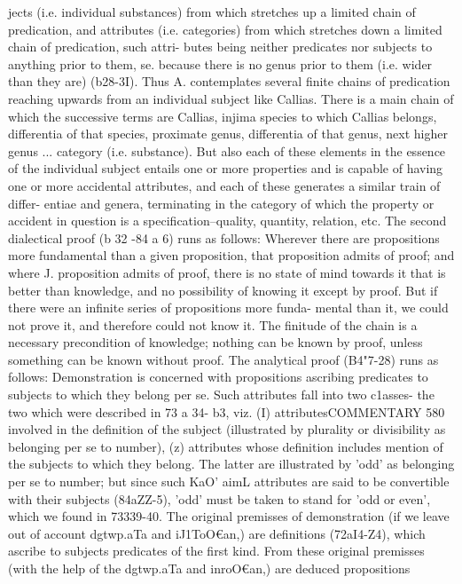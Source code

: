 {{{{{{{{{{{{{{{{{{{{{{{{{{{{{{jects (i.e. individual substances) from which stretches up a
limited chain of predication, and attributes (i.e. categories) from
which stretches down a limited chain of predication, such attri-
butes being neither predicates nor subjects to anything prior
to them, se. because there is no genus prior to them (i.e. wider
than they are) (b28-3I). Thus A. contemplates several finite
chains of predication reaching upwards from an individual subject
like Callias. There is a main chain of which the successive terms
are Callias, injima species to which Callias belongs, differentia
of that species, proximate genus, differentia of that genus, next
higher genus ... category (i.e. substance). But also each of these
elements in the essence of the individual subject entails one or
more properties and is capable of having one or more accidental
attributes, and each of these generates a similar train of differ-
entiae and genera, terminating in the category of which the
property or accident in question is a specification--quality,
quantity, relation, etc.
The second dialectical proof (b 32 -84 a 6) runs as follows: Wherever
there are propositions more fundamental than a given proposition,
that proposition admits of proof; and where J. proposition admits
of proof, there is no state of mind towards it that is better than
knowledge, and no possibility of knowing it except by proof.
But if there were an infinite series of propositions more funda-
mental than it, we could not prove it, and therefore could not
know it. The finitude of the chain is a necessary precondition
of knowledge; nothing can be known by proof, unless something
can be known without proof.
The analytical proof (B4"7-28) runs as follows: Demonstration
is concerned with propositions ascribing predicates to subjects
to which they belong per se. Such attributes fall into two c1asses-
the two which were described in 73 a 34- b3, viz. (I) attributesCOMMENTARY
580
involved in the definition of the subject (illustrated by plurality
or divisibility as belonging per se to number), (z) attributes
whose definition includes mention of the subjects to which they
belong. The latter are illustrated by 'odd' as belonging per se
to number; but since such KaO' aimL attributes are said to be
convertible with their subjects (84aZZ-5), 'odd' must be taken to
stand for 'odd or even', which we found in 73339-40. The original
premisses of demonstration (if we leave out of account dgtwp.aTa
and iJ1ToO€an,) are definitions (72aI4-Z4), which ascribe to subjects
predicates of the first kind. From these original premisses (with
the help of the dgtwp.aTa and inroO€an,) are deduced propositions
}}}}}}}}}}}}}}}}}}}}}}}}}}}}}}
